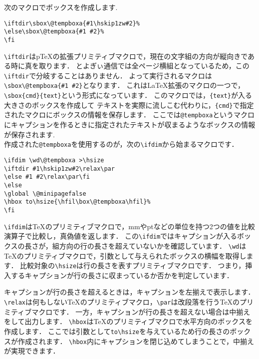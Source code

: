 次のマクロでボックスを作成します.
\begin{verbatim}
\iftdir\sbox\@tempboxa{#1\hskip1zw#2}%
\else\sbox\@tempboxa{#1 #2}%
\fi
\end{verbatim}%
\verb|\iftdir|は{p\TeX}の拡張プリミティブマクロで，現在の文字組の方向が縦向きである時に真を取ります．
とよぎぃ通信では全ページ横組となっているため，この\verb|\iftdir|で分岐することはありません．
よって実行されるマクロは\verb|\sbox\@tempboxa{#1 #2}|となります．
これは{\LaTeX}拡張のマクロの一つで，\verb|\sbox{cmd}{text}|という形式になっています．
このマクロでは，\verb|{text}|が入る大きさのボックスを作成して
テキストを実際に流しこむ代わりに，\verb|{cmd}|で指定されたマクロにボックスの情報を保存します．
ここでは\verb|@tempboxa|というマクロにキャプションを作るときに指定されたテキストが収まるようなボックスの情報が保存されます.\\
作成された\verb|@tempboxa|を使用するのが，次の\verb|\ifdim|から始まるマクロです．
\begin{verbatim}
\ifdim \wd\@tempboxa >\hsize
\iftdir #1\hskip1zw#2\relax\par
\else #1 #2\relax\par\fi
\else
\global \@minipagefalse
\hbox to\hsize{\hfil\box\@tempboxa\hfil}%
\fi
\end{verbatim}
\verb|\ifdim|は{\TeX}のプリミティブマクロで，mmやptなどの単位を持つ2つの値を比較演算子で比較し，真偽値を返します．
この\verb|\ifdim|ではキャプションが入るボックスの長さが，組方向の行の長さを超えていないかを確認しています．
\verb|\wd|は{\TeX}のプリミティブマクロで，引数として与えられたボックスの横幅を取得します．
比較対象の\verb|\hsize|は行の長さを表すプリミティブマクロです．
つまり，挿入するキャプションが行の長さに収まっているか否かを判定しています．

キャプションが行の長さを超えるときは，キャプションを左揃えで表示します．
\verb|\relax|は何もしない{\TeX}のプリミティブマクロ，\verb|\par|は改段落を行う{\TeX}のプリミティブマクロです．
一方，キャプションが行の長さを超えない場合は中揃えをして出力します．
\verb|\hbox|は{\TeX}のプリミティブマクロで水平方向のボックスを作成します．
ここでは引数として\verb|to\hsize|を与えているため行の長さのボックスが作成されます．
\verb|\hbox|内にキャプションを閉じ込めてしまうことで，中揃えが実現できます．


